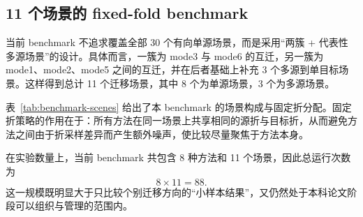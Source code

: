 \subsection{11 个场景的 fixed-fold benchmark}
当前 benchmark 不追求覆盖全部 30 个有向单源场景，而是采用“两簇 + 代表性多源场景”的设计。具体而言，一簇为 mode3 与 mode6 的互迁，另一簇为 mode1、mode2、mode5 之间的互迁，并在后者基础上补充 3 个多源到单目标场景。这样得到总计 11 个迁移场景，其中 8 个为单源场景，3 个为多源场景。

表~\ref{tab:benchmark-scenes} 给出了本 benchmark 的场景构成与固定折分配。固定折策略的作用在于：所有方法在同一场景上共享相同的源折与目标折，从而避免方法之间由于折采样差异而产生额外噪声，使比较尽量聚焦于方法本身。

\begin{table}[htbp]
\centering
\caption{88-run fixed-fold benchmark 的 11 个场景与折分配}
\label{tab:benchmark-scenes}
\small
{}
\normalsize
\end{table}

在实验数量上，当前 benchmark 共包含 8 种方法和 11 个场景，因此总运行次数为
\begin{equation}
8\times 11=88.
\end{equation}
这一规模既明显大于只比较个别迁移方向的“小样本结果”，又仍然处于本科论文阶段可以组织与管理的范围内。

